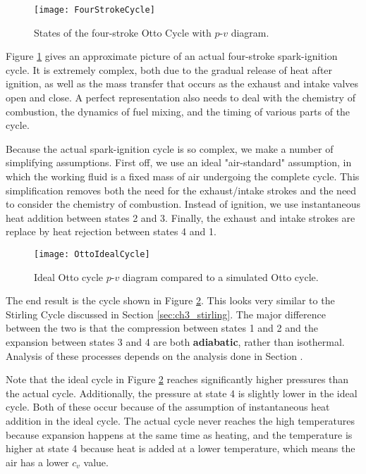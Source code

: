 \begin{figure}[H]
\centering
\texttt{[image: FourStrokeCycle]}
\caption{States of the four-stroke Otto Cycle with $p$-$v$ diagram.}
\label{fig:ch3_fourStroke}
\end{figure}

Figure \ref{fig:ch3_fourStroke} gives an approximate picture of an actual four-stroke spark-ignition cycle. It is extremely complex, both due to the gradual release of heat after ignition, as well as the mass transfer that occurs as the exhaust and intake valves open and close.  A perfect representation also needs to deal with the chemistry of combustion, the dynamics of fuel mixing, and the timing of various parts of the cycle.

Because the actual spark-ignition cycle is so complex, we make a number of simplifying assumptions.  First off, we use an ideal "air-standard" assumption, in which the working fluid is a fixed mass of air undergoing the complete cycle.  This simplification removes both the need for the exhaust/intake strokes and the need to consider the chemistry of combustion.  Instead of ignition, we use instantaneous heat addition between states 2 and 3.  Finally, the exhaust and intake strokes are replace by heat rejection between states 4 and 1.

\begin{figure}[H]
\centering
\texttt{[image: OttoIdealCycle]}
\caption{Ideal Otto cycle $p$-$v$ diagram compared to a simulated Otto cycle.}
\label{fig:ch3_ottoCycle}
\end{figure}

The end result is the cycle shown in Figure \ref{fig:ch3_ottoCycle}.  This looks very similar to the Stirling Cycle discussed in Section \ref{sec:ch3_stirling}.  The major difference between the two is that the compression between states 1 and 2 and the expansion between states 3 and 4 are both {\bf adiabatic}, rather than isothermal.  Analysis of these processes depends on the analysis done in Section \label{sec:ch3_idealGasAdiabatic}.

Note that the ideal cycle in Figure \ref{fig:ch3_ottoCycle} reaches significantly higher pressures than the actual cycle.  Additionally, the pressure at state 4 is slightly lower in the ideal cycle.  Both of these occur because of the assumption of instantaneous heat addition in the ideal cycle.  The actual cycle never reaches the high temperatures because expansion happens at the same time as heating, and the temperature is higher at state 4 because heat is added at a lower temperature, which means the air has a lower $c_v$ value.

